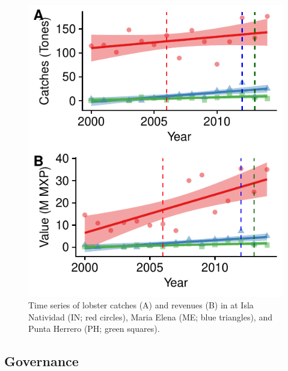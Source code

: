 \documentclass{frontiersSCNS}
\theoremstyle{definition}
\theoremstyle{definition}
\theoremstyle{definition}
\theoremstyle{remark}
\begin{document}
\begin{figure}
\centering
\includegraphics{Villasenor-Derbez_files/figure-latex/unnamed-chunk-8-1.pdf}
\caption{\label{fig:unnamed-chunk-8}\label{fig:lobsters}Time series of
lobster catches (A) and revenues (B) in at Isla Natividad (IN; red
circles), Maria Elena (ME; blue triangles), and Punta Herrero (PH; green
squares).}
\end{figure}

\subsection{Governance}\label{governance}
\end{document}
